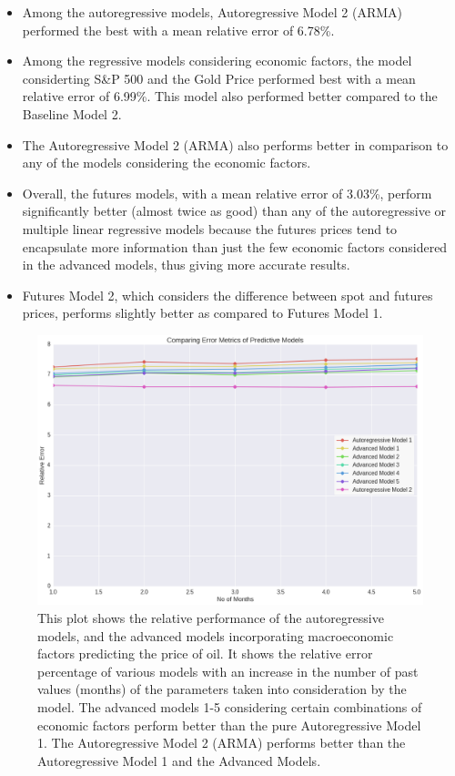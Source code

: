 \documentclass[runningheads]{llncs}
\begin{document}
\begin {itemize}

\item Among the autoregressive models, Autoregressive Model 2 (ARMA) performed the best with a mean relative error of 6.78\%. \\
\item Among the regressive models considering economic factors, the model considerting S\&P 500 and the Gold Price performed best with a mean relative error of 6.99\%. This model also performed better compared to the Baseline Model 2. \\
\item The Autoregressive Model 2 (ARMA) also performs better in comparison to any of the models considering the economic factors.\\
\item Overall, the futures models, with a mean relative error of 3.03\%, perform significantly better (almost twice as good) than any of the autoregressive or multiple linear regressive models because the futures prices tend to encapsulate more information than just the few economic factors considered in the advanced models, thus giving more accurate results. \\
\item Futures Model 2, which considers the difference between spot and futures prices, performs slightly better as compared to Futures Model 1.

\end {itemize}


\begin{figure}
\centering
\includegraphics[width=\textwidth]{ModelComparison_Oil.png}
\caption{This plot shows the relative performance of the autoregressive models, and the advanced models incorporating macroeconomic factors predicting the price of oil. It shows the relative error percentage of various models with an increase in the number of past values (months) of the parameters taken into consideration by the model. The advanced models 1-5 considering certain combinations of economic factors perform better than the pure Autoregressive Model 1. The Autoregressive Model 2 (ARMA) performs better than the Autoregressive Model 1 and the Advanced Models. }
\label{fig:ModelComparison_Oil.png}
\end{figure}
\end{document}
